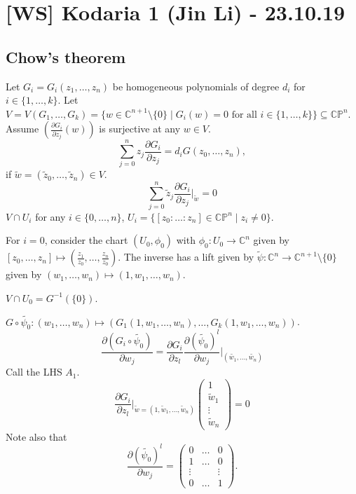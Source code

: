 \documentclass[11pt,A4]{article}
\theoremstyle{plain}
\theoremstyle{definition}
\theoremstyle{remark}
\newcommand{\1}{\mathbbm{1}}
\newcommand{\C}{\mathbb{C}}
\newcommand{\CP}{\mathbb{CP}}
\begin{document}
\section{[WS] Kodaria 1 (Jin Li) - 23.10.19}

\subsection{Chow's theorem}

Let $G_{i}=G_{i}(z_{1},\ldots,z_{n})$ be homogeneous polynomials of degree $d_{i}$ for $i\in \{1,\ldots,k\}$.
Let $V=V(G_{1},\ldots,G_{k})=\{w\in \C^{n+1}\setminus \{0 \}\mid G_{i}(w)=0 \text{ for all }i\in \{1,\ldots,k\}\}\subseteq \CP^{n}$.
Assume $(\frac{\partial G_{i}}{\partial z_{j}}(w))$ is surjective at any $w\in V$.
\[ \sum_{j=0}^{n}z_{j}\frac{\partial G_{i}}{\partial z_{j}}=d_{i}G(z_{0},\ldots,z_{n}), \]
if $\tilde{w}=(\tilde{z}_{0},\ldots,\tilde{z}_{n})\in V$.
\[ \sum_{j=0}^{n}\tilde{z}_{j}\frac{\partial G_{i}}{\partial z_{j}}|_{\tilde{w}}=0\]
$V\cap U_{i}$ for any $i\in \{0,\ldots,n\}$, $U_{i}=\{[z_{0}:\ldots:z_{n}]\in \CP^{n}\mid z_{i}\neq 0\}$.

For $i=0$, consider the chart $(U_{0},\phi_{0})$ with $\phi_{0}\colon U_{0}\to \C^{n}$ given by $[z_{0},\ldots,z_{n}]\mapsto (\frac{z_{1}}{z_{0}},\ldots,\frac{z_{n}}{z_{0}})$.
The inverse has a lift given by $\tilde{\psi}\colon \C^{n}\to \C^{n+1}\setminus \{0\}$ given by $(w_{1},\ldots,w_{n})\mapsto (1,w_{1},\ldots,w_{n})$.
\begin{center}
\end{center}
$V\cap U_{0}=G^{-1}(\{0\})$.

$G\circ \tilde{\psi_{0}}\colon (w_{1},\ldots,w_{n})\mapsto (G_{1}(1,w_{1},\ldots,w_{n}),\ldots,G_{k}(1,w_{1},\ldots,w_{n}))$.
\[ \frac{\partial (G_{i}\circ \tilde{\psi_{0}})}{\partial w_{j}} = \frac{\partial G_{i}}{\partial z_{l}}\frac{\partial(\tilde{\psi_{0}})^{l}}{\partial w_{j}}|_{(\tilde{w_{1}},\ldots,\tilde{w_{n}})} \]
Call the LHS $A_{1}$.
\begin{equation}
    \frac{\partial G_{i}}{\partial z_{l}}|_{\tilde{w}=(1,\tilde{w}_{1},\ldots,\tilde{w}_{n})}\begin{pmatrix} 1 \\ \tilde{w}_{1} \\ \vdots \\ \tilde{w}_{n} \end{pmatrix} = 0
\end{equation}
Note also that
\[\frac{\partial (\tilde{\psi_{0}})^{l}}{\partial w_{j}}=\begin{pmatrix} 0 & \ldots & 0 \\ 1 & \ldots & 0\\ \vdots & & \vdots \\ 0 & \ldots & 1 \end{pmatrix}.\]
\end{document}
